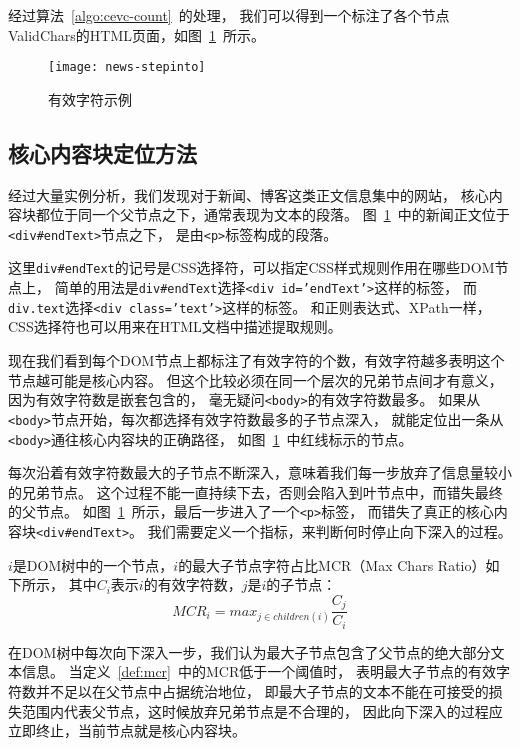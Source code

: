 经过算法~\ref{algo:cevc-count}~的处理，
我们可以得到一个标注了各个节点ValidChars的HTML页面，如图~\ref{fig:news-stepinto}~所示。

\begin{figure}[t]
\centering
\texttt{[image: news-stepinto]}
\caption{有效字符示例}
\label{fig:news-stepinto}
\end{figure}

\subsection{核心内容块定位方法}
经过大量实例分析，我们发现对于新闻、博客这类正文信息集中的网站，
核心内容块都位于同一个父节点之下，通常表现为文本的段落。
图~\ref{fig:news-stepinto}~中的新闻正文位于\texttt{<div\#endText>}节点之下，
是由\texttt{<p>}标签构成的段落。

这里\texttt{div\#endText}的记号是CSS选择符，可以指定CSS样式规则作用在哪些DOM节点上，
简单的用法是\texttt{div\#endText}选择\texttt{<div id='endText'>}这样的标签，
而\texttt{div.text}选择\texttt{<div class='text'>}这样的标签。
和正则表达式、XPath一样，CSS选择符也可以用来在HTML文档中描述提取规则。

现在我们看到每个DOM节点上都标注了有效字符的个数，有效字符越多表明这个节点越可能是核心内容。
但这个比较必须在同一个层次的兄弟节点间才有意义，因为有效字符数是嵌套包含的，
毫无疑问\texttt{<body>}的有效字符数最多。
如果从\texttt{<body>}节点开始，每次都选择有效字符数最多的子节点深入，
就能定位出一条从\texttt{<body>}通往核心内容块的正确路径，
如图~\ref{fig:news-stepinto}~中红线标示的节点。

每次沿着有效字符数最大的子节点不断深入，意味着我们每一步放弃了信息量较小的兄弟节点。
这个过程不能一直持续下去，否则会陷入到叶节点中，而错失最终的父节点。
如图~\ref{fig:news-stepinto}~所示，最后一步进入了一个\texttt{<p>}标签，
而错失了真正的核心内容块\texttt{<div\#endText>}。
我们需要定义一个指标，来判断何时停止向下深入的过程。

\begin{definition}
\label{def:mcr}
$i$是DOM树中的一个节点，$i$的最大子节点字符占比MCR（Max Chars Ratio）如下所示，
其中$C_i$表示$i$的有效字符数，$j$是$i$的子节点：
\begin{equation}
MCR_i = max_{j \in children(i)} \frac{C_j}{C_i}
\end{equation}
\end{definition}

在DOM树中每次向下深入一步，我们认为最大子节点包含了父节点的绝大部分文本信息。
当定义~\ref{def:mcr}~中的MCR低于一个阈值时，
表明最大子节点的有效字符数并不足以在父节点中占据统治地位，
即最大子节点的文本不能在可接受的损失范围内代表父节点，这时候放弃兄弟节点是不合理的，
因此向下深入的过程应立即终止，当前节点就是核心内容块。

